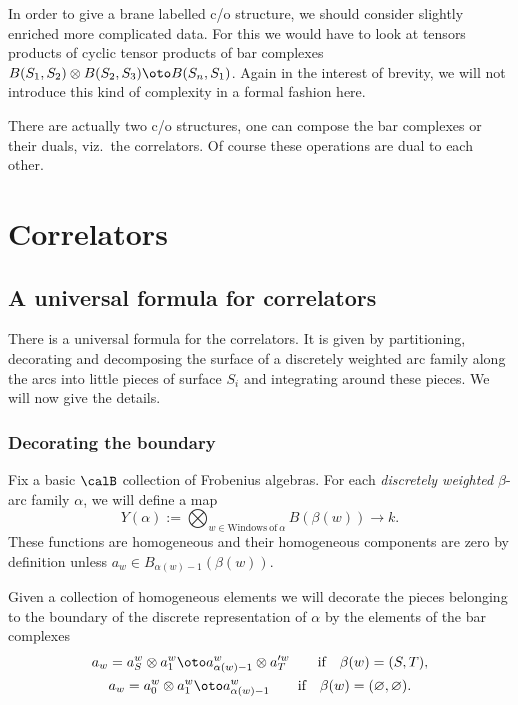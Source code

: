 \begin{rmk}
In order to give a brane labelled c/o structure, we should consider
slightly enriched more complicated data. For this we would have to
look at tensors products of cyclic tensor products of bar complexes
$B(S_1,S_2)\otimes B(S_2,S_3)\oto B(S_n,S_1)$. Again in the interest
of brevity, we will not introduce this kind of complexity in a
formal fashion here.
\end{rmk}

\begin{rmk}
There are actually two c/o structures, one can compose the bar
complexes or their duals, viz.\ the correlators. Of course these
operations are dual to each other.
\end{rmk}


\section{Correlators}
\label{corsection}

\subsection{A universal formula for  correlators}
 There is a universal formula for the correlators. It is given by partitioning, decorating
and  de\-com\-posing the surface of a discretely weighted arc family
  along the arcs into little pieces of surface $S_i$ and integrating around
these pieces. We will now give the details.



\subsubsection{Decorating the boundary}
Fix a basic $\calB$ collection of Frobenius algebras.  For each {\em
discretely weighted} $\beta$-arc family $\alpha$,  we will def\/ine a
map
\[
Y(\alpha):= \bigotimes_{w \in \mathrm {Windows~of~}\alpha}B(\beta(w))\to k.
\]
These functions are homogeneous and their homogeneous components  are  zero by def\/inition unless
 $a_w\in B_{\alpha(w)-1}(\beta(w)) $.

Given a collection of homogeneous elements
we will decorate the pieces belonging to the boundary of the discrete representation of $\alpha$ by
the elements of the bar complexes
\begin{gather*}
a_w = a^w_S\otimes a_1^w \oto a^w_{\alpha(w)-1}\otimes a_T^{\prime w} \qquad \text{if} \quad \beta(w)=(S,T),\\
a_w = a^w_0\otimes a_1^w \oto a^w_{\alpha(w)-1}  \qquad \text{if} \quad
\beta(w)=(\varnothing,\varnothing).
\end{gather*}

